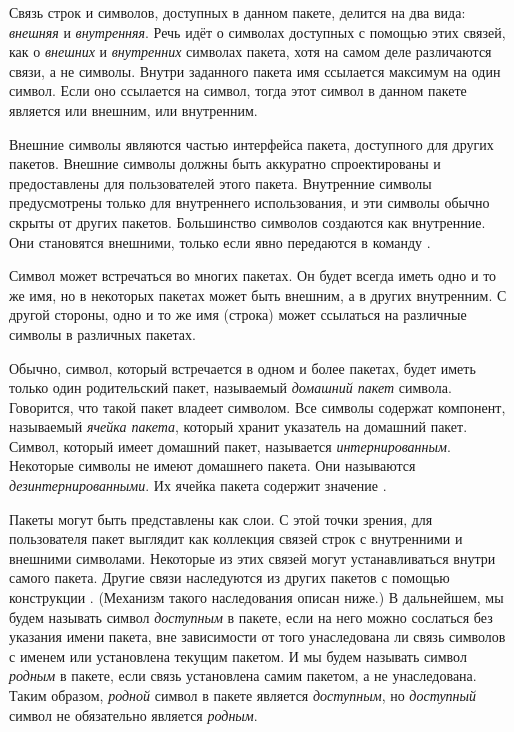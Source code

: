 Связь строк и символов, доступных в данном пакете, делится на два вида:
\emph{внешняя} и \emph{внутренняя}. Речь идёт о символах доступных с помощью
этих связей, как о \emph{внешних} и \emph{внутренних} символах пакета, хотя
на самом деле различаются связи, а не символы.
Внутри заданного пакета имя ссылается максимум на один символ. Если оно
ссылается на символ, тогда этот символ в данном пакете является или внешним, или
внутренним.

Внешние символы являются частью интерфейса пакета, доступного для других
пакетов. Внешние символы должны быть аккуратно спроектированы и 
предоставлены для пользователей этого пакета. Внутренние символы
предусмотрены только для внутреннего использования, и эти символы обычно скрыты
от других пакетов. Большинство символов создаются как внутренние. Они становятся
внешними, только если явно передаются в команду .

Символ может встречаться во многих пакетах. Он будет всегда иметь одно и то же
имя, но в некоторых пакетах может быть внешним, а в других внутренним. С другой
стороны, одно и то же имя (строка) может ссылаться на различные символы в
различных пакетах.

Обычно, символ, который встречается в одном и более пакетах, будет иметь только
один родительский пакет, называемый \emph{домашний пакет} символа. Говорится,
что такой пакет владеет символом.
Все символы содержат компонент, называемый \emph{ячейка пакета}, который хранит
указатель на домашний пакет.
Символ, который имеет домашний пакет, называется \emph{интернированным}.
Некоторые символы не имеют домашнего пакета. Они называются
\emph{дезинтернированными}. Их ячейка пакета содержит значение {\false}.

Пакеты могут быть представлены как слои. С этой точки зрения, для пользователя
пакет выглядит как коллекция связей строк с внутренними и внешними
символами. Некоторые из этих связей могут устанавливаться внутри
самого пакета. Другие связи наследуются из других пакетов с
помощью конструкции . (Механизм такого наследования описан
ниже.) В дальнейшем, мы будем называть символ \emph{доступным} в пакете, если
на него можно сослаться без указания имени пакета, вне зависимости от
того унаследована ли связь символов с именем или установлена текущим пакетом. И
мы будем называть символ \emph{родным} в пакете, если связь установлена
самим пакетом, а не унаследована. Таким образом, \emph{родной} символ в пакете
является \emph{доступным}, но \emph{доступный} символ не обязательно является
\emph{родным}.

